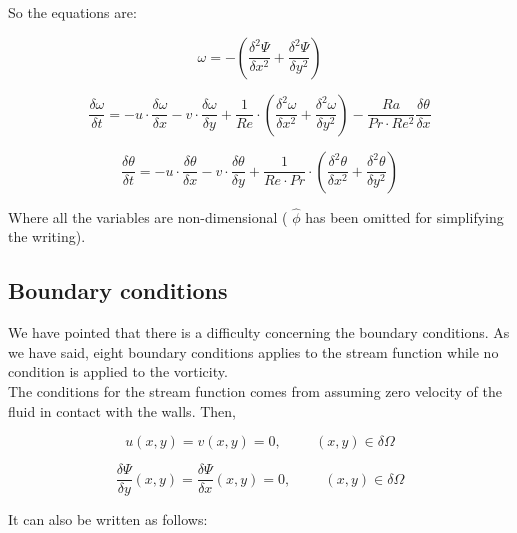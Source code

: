 So the equations are: 

\begin {equation} \label{cont3}
\omega= - \left( \frac{\delta^2 \Psi}{\delta x^2} + \frac{\delta^2
 \Psi}{\delta y^2} \right)
\end{equation}

\begin {equation} \label{cdm3}
 \frac{\delta \omega}{\delta t} = -u \cdot \frac{\delta \omega}{\delta x} -v
 \cdot \frac{\delta \omega}{\delta y} +
 \frac{1}{Re} \cdot \left( \frac{\delta^2 \omega}{\delta x^2} + \frac{\delta^2
 \omega}{\delta y^2} \right) - \frac{Ra}{Pr \cdot Re^2}
\frac{\delta \theta}{\delta x}
\end{equation}

\begin {equation} \label{ener3}
 \frac{\delta \theta}{\delta t} =  -u \cdot \frac{\delta \theta}{\delta x} -v
 \cdot \frac{\delta \theta}{\delta y}+ \frac{1}{Re \cdot Pr} \cdot \left(
 \frac{\delta^2 \theta}{\delta x^2} + \frac{\delta^2 \theta}{\delta y^2} \right)
\end{equation}


Where all the variables are non-dimensional ( $\hat{\phi}$ has been omitted for
simplifying the writing).

\subsection{Boundary conditions}

We have pointed that there is a difficulty concerning the boundary conditions.
As we have said, eight boundary conditions applies to the stream function while
no condition is applied to the vorticity. \\

The conditions for the stream function comes from assuming zero velocity of the
fluid in contact with the walls. Then, 

\begin{equation}
u(x,y)=v(x,y)=0, \hspace{1cm} (x,y)\in \delta \Omega
\end{equation}

\begin{equation}
\frac{\delta \Psi}{\delta y} (x,y)= \frac{\delta \Psi}{\delta x} (x,y)=0,
\hspace{1cm} (x,y)\in \delta \Omega
\end{equation}

It can also be written as follows: 

